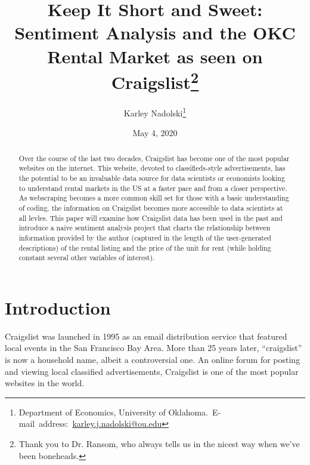 \documentclass[12pt,english]{article}
\begin{document}
\begin{singlespace}
\title{Keep It Short and Sweet: Sentiment Analysis and the OKC Rental Market as seen on Craigslist\thanks{Thank you to Dr. Ransom, who always tells us in the nicest way when we've been boneheads.}}
\end{singlespace}

\author{Karley Nadolski\thanks{Department of Economics, University of Oklahoma.\
E-mail~address:~\href{mailto:karley.j.nadolski@ou.edu}{karley.j.nadolski@ou.edu}}}

\date{May 4, 2020}

\maketitle

\begin{abstract}
\begin{singlespace}
Over the course of the last two decades, Craigslist has become one of the most popular websites on the internet. This website, devoted to classifieds-style advertisements, has the potential to be an invaluable data source for data scientists or economists looking to understand rental markets in the US at a faster pace and from a closer perspective. As webscraping becomes a more common skill set for those with a basic understanding of coding, the information on Craigslist becomes more accessible to data scientists at all levles. This paper will examine how Craigslist data has been used in the past and introduce a naive sentiment analysis project that charts the relationship between information provided by the author (captured in the length of the user-generated descriptions) of the rental listing and the price of the unit for rent (while holding constant several other variables of interest).  
\end{singlespace}

\end{abstract}
\vfill{}


\pagebreak{}


\section{Introduction}\label{sec:intro}

Craigslist was launched in 1995 as an email distribution service that featured local events in the San Francisco Bay Area. More than 25 years later, “craigslist” is now a household name, albeit a controversial one. An online forum for posting and viewing local classified advertisements, Craigslist is one of the most popular websites in the world. 
\end{document}
